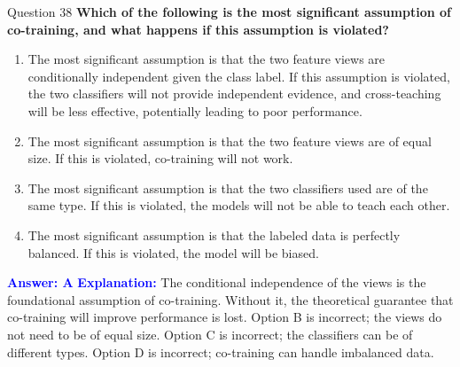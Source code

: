 \documentclass{beamer}
\begin{document}
	\begin{frame}{Question 38}
		\textbf{Which of the following is the most significant assumption of co-training, and what happens if this assumption is violated?}
		\begin{enumerate}
			\item The most significant assumption is that the two feature views are conditionally independent given the class label. If this assumption is violated, the two classifiers will not provide independent evidence, and cross-teaching will be less effective, potentially leading to poor performance.
			\item The most significant assumption is that the two feature views are of equal size. If this is violated, co-training will not work.
			\item The most significant assumption is that the two classifiers used are of the same type. If this is violated, the models will not be able to teach each other.
			\item The most significant assumption is that the labeled data is perfectly balanced. If this is violated, the model will be biased.
		\end{enumerate}
		\vspace{0.2cm}
		\textcolor{blue}{\textbf{Answer: A}}
		\vspace{0.2cm}
		\textcolor{blue}{\textbf{Explanation:}} The conditional independence of the views is the foundational assumption of co-training. Without it, the theoretical guarantee that co-training will improve performance is lost. Option B is incorrect; the views do not need to be of equal size. Option C is incorrect; the classifiers can be of different types. Option D is incorrect; co-training can handle imbalanced data.
	\end{frame}
	
\end{document}
